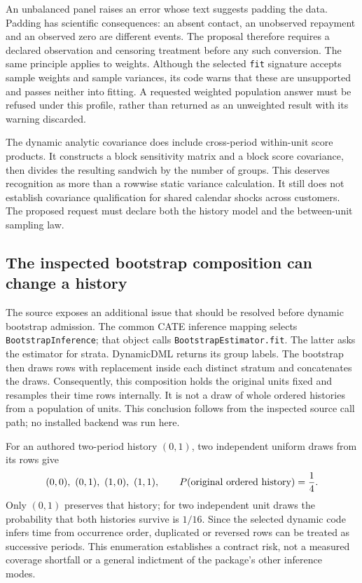 An unbalanced panel raises an error whose text suggests padding the data.
Padding has scientific consequences: an absent contact, an unobserved
repayment and an observed zero are different events. The proposal therefore
requires a declared observation and censoring treatment before any such
conversion. The same principle applies to weights. Although the selected
\texttt{fit} signature accepts sample weights and sample variances, its code
warns that these are unsupported and passes neither into fitting. A requested
weighted population answer must be refused under this profile, rather than
returned as an unweighted result with its warning discarded.
\citep{exec19_econml_source}

The dynamic analytic covariance does include cross-period within-unit score
products. It constructs a block sensitivity matrix and a block score
covariance, then divides the resulting sandwich by the number of groups.
This deserves recognition as more than a rowwise static variance calculation.
It still does not establish covariance qualification for shared calendar
shocks across customers. The proposed request must declare both the history
model and the between-unit sampling law.~\citep{exec19_econml_source}

\subsection{The inspected bootstrap composition can change a history}
\label{exec19:econml-bootstrap}

The source exposes an additional issue that should be resolved before dynamic
bootstrap admission. The common CATE inference mapping selects
\texttt{BootstrapInference}; that object calls \texttt{BootstrapEstimator.fit}.
The latter asks the estimator for strata. DynamicDML returns its group labels.
The bootstrap then draws rows with replacement inside each distinct stratum
and concatenates the draws. Consequently, this composition holds the original
units fixed and resamples their time rows internally. It is not a draw of
whole ordered histories from a population of units. This conclusion follows
from the inspected source call path; no installed backend was run here.
\citep{exec19_econml_source}

For an authored two-period history $(0,1)$, two independent uniform draws from
its rows give
\begin{equation}
 (0,0),\ (0,1),\ (1,0),\ (1,1),
 \qquad P(\hbox{original ordered history})=\frac14.
 \label{exec19:econml-resampling}
\end{equation}
Only $(0,1)$ preserves that history; for two independent unit draws the
probability that both histories survive is $1/16$. Since the selected dynamic
code infers time from occurrence order, duplicated or reversed rows can be
treated as successive periods. This enumeration establishes a contract risk,
not a measured coverage shortfall or a general indictment of the package's
other inference modes.~\citep{exec19_econml_reference}

